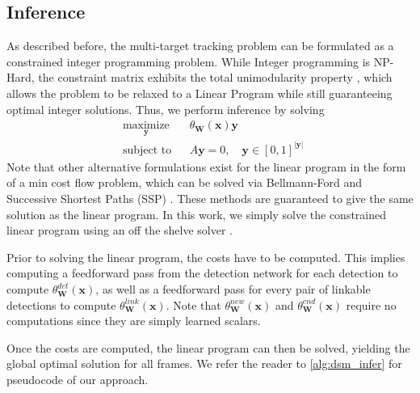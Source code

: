 \documentclass[letterpaper, 10 pt, conference]{ieeeconf}  \pdfminorversion=4
\newcommand{\binvarset}{\mathbf{y}}
\newcommand{\obsvarset}{\mathbf{x}}
\newcommand{\weightset}{\mathbf{W}}
\newcommand{\modelfun}{\theta}
\newcommand{\by}{\mathbf{y}}
\begin{document}
\subsection{Inference }
\label{sc:dsm_inference}




As described before, the multi-target tracking problem can be formulated as a constrained integer programming problem. While Integer programming is NP-Hard, the constraint matrix exhibits the total unimodularity property \cite{berclaz}, which allows the problem to be relaxed to a Linear Program while still guaranteeing optimal integer solutions. Thus, we perform inference by solving
\begin{equation}
\label{eq:blank_lp}
  \begin{aligned}
  & \underset{\binvarset}{\text{maximize}}
    & & \modelfun_\weightset(\obsvarset) \binvarset   \\
  & \text{subject to}
    & & A \binvarset = 0,
\quad \by \in [0, 1]^{|\by|}\ \end{aligned}
\end{equation}
Note that other alternative formulations exist for the linear program in the form of a min cost flow problem, which can be solved via Bellmann-Ford \cite{bf_book} and Successive Shortest Paths (SSP) \cite{ssp_book}. These methods are guaranteed to give the same solution as the linear program. In this work, we simply solve the constrained linear program using  an off the shelve solver  \cite{ortools}.

Prior to solving the linear program, the costs have to be computed. This implies computing a feedforward pass from the detection network for each detection to compute $\modelfun_\weightset^{det}(\obsvarset)$, as well as a feedforward pass for every pair of linkable detections to compute $\modelfun_\weightset^{link}(\obsvarset)$. Note that $\modelfun_\weightset^{new}(\obsvarset)$ and $\modelfun_\weightset^{end}(\obsvarset)$ require no computations since they are simply learned scalars.

Once the costs are computed, the linear program can then be solved, yielding the global optimal solution for all frames.
We refer the reader to \autoref{alg:dsm_infer} for pseudocode of our approach.
\end{document}
